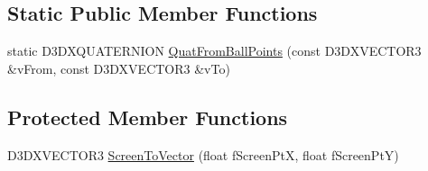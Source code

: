 \subsection*{Static Public Member Functions}
\begin{DoxyCompactItemize}
\item 
static D3DXQUATERNION \hyperlink{class_c_d3_d_arc_ball_ab4ab2df9ad0ee6239a79bc826dc35249}{QuatFromBallPoints} (const D3DXVECTOR3 \&vFrom, const D3DXVECTOR3 \&vTo)
\end{DoxyCompactItemize}
\subsection*{Protected Member Functions}
\begin{DoxyCompactItemize}
\item 
D3DXVECTOR3 \hyperlink{class_c_d3_d_arc_ball_a7c1d50c7a090b1b64ea528cddc1858dc}{ScreenToVector} (float fScreenPtX, float fScreenPtY)
\end{DoxyCompactItemize}
